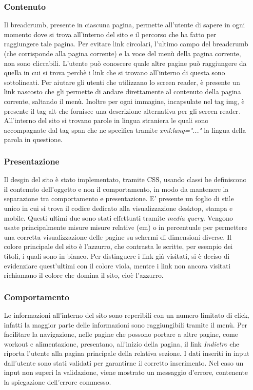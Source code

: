 \subsubsection{Contenuto}
Il breadcrumb, presente in ciascuna pagina, permette all'utente di sapere in ogni momento dove si trova all'interno del sito e il percorso che ha fatto per raggiungere tale pagina. Per evitare link circolari, l'ultimo campo del breadcrumb (che corrisponde alla pagina corrente) e la voce del menù della pagina corrente, non sono cliccabili. L'utente può conoscere quale altre pagine può raggiungere da quella in cui si trova perchè i link che si trovano all'interno di questa sono sottolineati. 
Per aiutare gli utenti che utilizzano lo screen reader, è presente un link nascosto che gli permette di andare direttamente al contenuto della pagina corrente, saltando il menù. Inoltre per ogni immagine, incapsulate nel tag img, è presente il tag alt che fornisce una  descrizione alternativa per gli screen reader. 
All'interno del sito si trovano parole in lingua straniera le quali sono accompagnate dal tag span che ne specifica tramite \textit{xml:lang="..."} la lingua della parola in questione. 


\subsubsection{Presentazione}
Il desgin del sito è stato implementato, tramite CSS, usando classi he definiscono il contenuto
dell’oggetto e non il comportamento, in modo da mantenere la separazione tra comportamento e presentazione. E' presente un foglio di stile unico in cui si trova il codice dedicato alla visualizzazione desktop, stampa e mobile. Questi ultimi due sono stati effettuati tramite \textit{media query}. Vengono usate principalmente misure  misure relative (em) o in percentuale per permettere una corretta visualizzazione delle pagine su schermi di dimensioni diverse. 
Il colore principale del sito è l'azzurro, che contrasta le scritte, per esempio dei titoli, i quali sono in bianco. Per distinguere i link già visitati, si è deciso di evidenziare quest'ultimi con il colore viola, mentre i link non ancora visitati richiamano il colore che domina il sito, cioè l'azzurro. 


\subsubsection{Comportamento}
Le informazioni all'interno del sito sono reperibili con un numero
limitato di click, infatti la maggior parte delle informazioni sono raggiungibili tramite il menù. 
Per facilitare la navigazione, nelle pagine che possono portare a altre pagine, come workout e alimentazione, presentano, all'inizio della pagina, il link \textit{Indietro} che riporta l'utente alla pagina principale della relativa sezione. 
I dati inseriti in input dall'utente sono stati validati per garantirne il corretto inserimento. Nel caso un input non superi la validazione, viene mostrato un messaggio d'errore, contenente la spiegazione dell’errore commesso.

